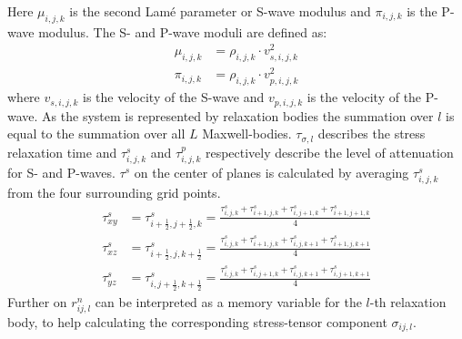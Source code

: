 \documentclass[pdftex,a4paper,parskip,listof=totoc,bibliography=totoc,onehalfspacing,12pt]{scrreprt}
\begin{document}
Here $\mu_{i,j,k}$ is the second Lam\'{e} parameter or S-wave modulus and $\pi_{i,j,k}$ is the P-wave modulus.
The S- and P-wave moduli are defined as:
\begin{align}
	\mu_{i,j,k}&= \rho_{i,j,k}\cdot v_{s,i,j,k}^{2}\\
	\pi_{i,j,k} &= \rho_{i,j,k}\cdot v_{p,i,j,k}^{2}
\end{align}
where $v_{s,i,j,k}$ is the velocity of the S-wave and $v_{p,i,j,k}$ is the velocity of the P-wave.
As the system is represented by relaxation bodies the summation over $l$ is equal to the summation over all $L$ Maxwell-bodies. $\tau_{\sigma,l}$ describes the stress relaxation time and $\tau^s_{i,j,k}$ and $\tau^p_{i,j,k}$ respectively describe the level of attenuation for S- and P-waves. $\tau^s$ on the center of planes is calculated by averaging $\tau^s_{i,j,k}$  from the four surrounding grid points. 
\begin{align*}
	\tau^s_{xy} &= \tau^s_{i+\frac{1}{2},j+\frac{1}{2},k} = \frac{\tau^s_{i,j,k} + \tau^s_{i+1,j,k} + \tau^s_{i,j+1,k} + \tau^s_{i+1,j+1,k}}{4}\\
	\tau^s_{xz} &= \tau^s_{i+\frac{1}{2},j,k+\frac{1}{2}} = \frac{\tau^s_{i,j,k} + \tau^s_{i+1,j,k} + \tau^s_{i,j,k+1} + \tau^s_{i+1,j,k+1}}{4}\\
	\tau^s_{yz} &= \tau^s_{i,j+\frac{1}{2},k+\frac{1}{2}} = \frac{\tau^s_{i,j,k} + \tau^s_{i,j+1,k} + \tau^s_{i,j,k+1} + \tau^s_{i,j+1,k+1}}{4}
\end{align*}
Further on $r_{ij,l}^{n}$ can be interpreted as a memory variable for the $l$-th relaxation body, to help calculating the corresponding stress-tensor component $\sigma_{ij,l}$.
\end{document}
